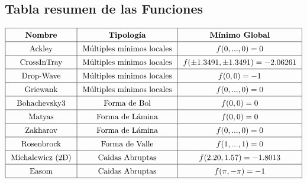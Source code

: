 \documentclass{article}
\begin{document}
\subsection{Tabla resumen de las Funciones}
\[\arraycolsep=7pt\def\arraystretch{1.4}
\begin{array}{|c|c|c|}
\hline
\text{\textbf{Nombre}} & \text{\textbf{Tipología}} & \text{\textbf{Mínimo Global}} \\ \hline
\text{Ackley} & \text{Múltiples mínimos locales} & f(0,...,0)=0 \\ \hline
\text{CrossInTray} & \text{Múltiples mínimos locales} & f(\pm 1.3491, \pm 1.3491)=-2.06261 \\ \hline
\text{Drop-Wave} & \text{Múltiples mínimos locales} & f(0,0)=-1 \\ \hline
\text{Griewank} & \text{Múltiples mínimos locales} & f(0,...,0)=0 \\ \hline
\text{Bohachevsky3} & \text{Forma de Bol} & f(0,0)=0 \\ \hline
\text{Matyas} & \text{Forma de Lámina} & f(0,0)=0 \\ \hline
\text{Zakharov} & \text{Forma de Lámina} & f(0,...,0)=0 \\ \hline
\text{Rosenbrock} & \text{Forma de Valle} & f(1,...,1)=0 \\ \hline
\text{Michalewicz (2D)} & \text{Caidas Abruptas} & f(2.20,1.57)=-1.8013 \\ \hline
\text{Easom} & \text{Caidas Abruptas} & f(\pi,-\pi)=-1 \\ \hline
\end{array}\]
\end{document}
